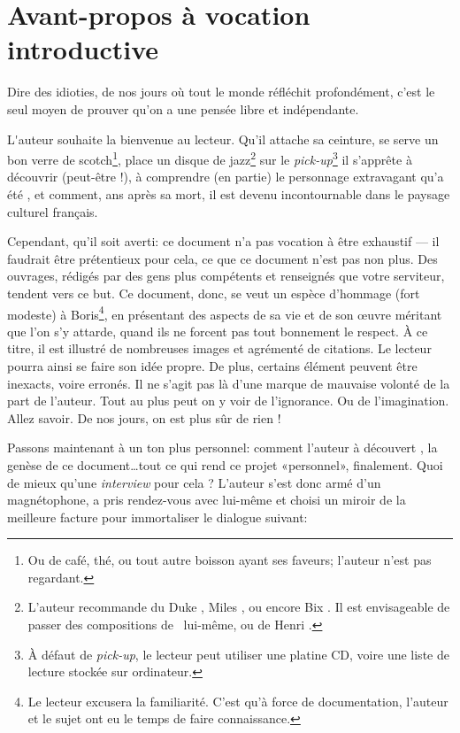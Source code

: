 \frontmatter

\chapter{Avant-propos à vocation introductive}
\epigraph{Dire des idioties, de nos jours où tout le monde réfléchit profondément, c'est le seul moyen de prouver qu'on a une pensée libre et indépendante.}{\BV}
\vfill
\pagebreak

\lettrine{L}'auteur souhaite la bienvenue au lecteur. Qu'il attache sa ceinture,
se serve un bon verre de scotch\footnote{Ou de café, thé, ou tout autre
boisson ayant ses faveurs; l'auteur n'est pas regardant.}, place un
disque de jazz\footnote{L'auteur recommande du Duke , 
Miles , ou encore Bix . Il est envisageable de
passer des compositions de \BV\ lui-même, ou de Henri .}
sur le \emph{pick-up}\footnote{À défaut de \emph{pick-up},
le lecteur peut utiliser une platine CD, voire une liste de lecture
stockée sur ordinateur.}
il s'apprête à découvrir (peut-être !), à comprendre (en partie) le
personnage extravagant qu'a été \BV, et comment,  ans après
sa mort, il est devenu incontournable dans le paysage culturel français.

Cependant, qu'il soit averti: ce document n'a pas vocation à être exhaustif
--- il faudrait être prétentieux pour cela, ce que ce document n'est pas
non plus. Des ouvrages, rédigés par des gens plus compétents et renseignés
que votre serviteur, tendent vers ce but.
Ce document, donc, se veut un espèce d'hommage (fort modeste) à
Boris\footnote{Le lecteur excusera la familiarité. C'est qu'à force de
documentation, l'auteur et le sujet ont eu le temps de faire connaissance.},
en présentant des aspects de sa vie et de son \oe{}uvre méritant
que l'on s'y attarde, quand ils ne forcent pas tout bonnement le respect.
À ce titre, il est illustré de nombreuses images et agrémenté
de citations. Le lecteur pourra ainsi se faire son idée propre. De plus, 
certains élément peuvent être inexacts, voire erronés. Il ne
s'agit pas là d'une marque de mauvaise volonté de la part de l'auteur. Tout
au plus peut on y voir de l'ignorance. Ou de l'imagination. Allez savoir.
De nos jours, on est plus sûr de rien !


Passons maintenant à un ton plus personnel: comment l'auteur à
 découvert \BV, la genèse de ce document\ldots tout ce qui rend ce projet «personnel», finalement.
Quoi de mieux qu'une \emph{interview} pour cela ?
L'auteur s'est donc armé d'un magnétophone, a pris rendez-vous avec lui-même
et choisi un miroir de la meilleure facture pour immortaliser le dialogue suivant:

